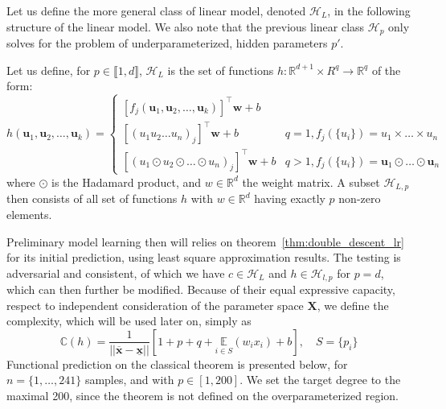 \documentclass[10pt]{article} %
\begin{document}
Let us define the more general class of linear model, denoted $\mathcal{H}_{L}$, in the following structure of the linear model. We also note that the previous linear class $\mathcal{H}_{p}$ only solves for the problem of underparameterized, hidden parameters $p'$.

\begin{definition}
    Let us define, for $p\in\llbracket1,d\rrbracket$, $\mathcal{H}_{L}$ is the set of functions $h:\mathbb{R}^{d+1}\times R^{q}\to\mathbb{R}^{q}$ of the form: 
    \begin{equation}
        h(\mathbf{u}_{1},\mathbf{u}_{2},\dots,\mathbf{u}_{k}) =  \begin{cases}
            [f_{j}(\mathbf{u}_{1},\mathbf{u}_{2},\dots,\mathbf{u}_{k})]^{\top}\mathbf{w}+b\\
            [(u_{1}u_{2}\dots u_{n})_{j}]^{\top}\mathbf{w} +b & q=1, f_{j}(\{u_{i}\}) = u_{1}\times\dots\times u_{n}\\
            [(u_{1}\odot u_{2}\odot\dots \odot  u_{n})_{j}]^{\top}\mathbf{w} +b & q > 1, f_{j}(\{u_{i}\}) = \mathbf{u}_{1}\odot\dots\odot \mathbf{u}_{n}
        \end{cases}
    \end{equation}
    where $\odot$ is the Hadamard product, and $w\in \mathbb{R}^{d}$ the weight matrix. A subset $\mathcal{H}_{L,p}$ then consists of all set of functions $h$ with $w\in \mathbb{R}^{d}$ having exactly $p$ non-zero elements. 
\end{definition}

Preliminary model learning then will relies on theorem~\ref{thm:double_descent_lr} for its initial prediction, using least square approximation results. The testing is adversarial and consistent, of which we have $c\in \mathcal{H}_{L}$ and $h\in \mathcal{H}_{l,p}$ for $p=d$, which can then further be modified. Because of their equal expressive capacity, respect to independent consideration of the parameter space $\mathbf{X}$, we define the complexity, which will be used later on, simply as \begin{equation}
    \mathbb{C}(h) = \frac{1}{||\overline{\mathbf{x}}-\underline{\mathbf{x}}||}\left[1+p + q + \underset{i\in S}{\mathbb{E}} (w_{i}x_{i})+b\right],\quad S = \{p_{i}\}
\end{equation}
Functional prediction on the classical theorem is presented below, for $n=\{1,\dots,241\}$ samples, and with $p\in[1,200]$. We set the target degree to the maximal 200, since the theorem is not defined on the overparameterized region. 
\end{document}
